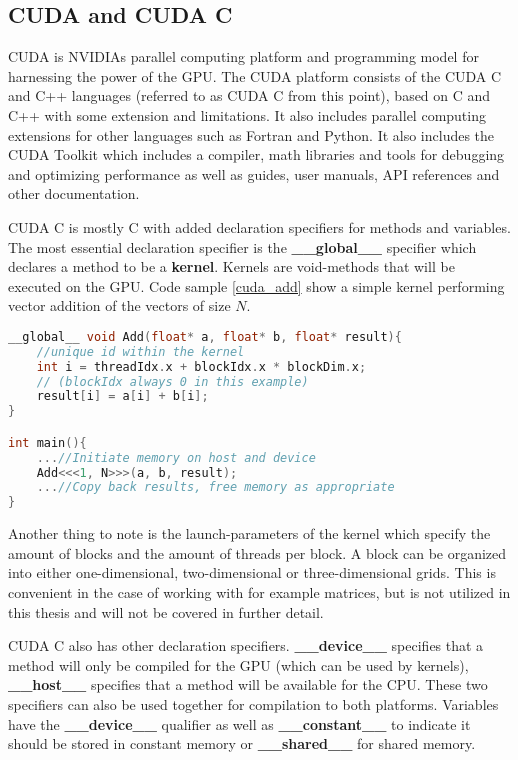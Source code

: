 \subsection{CUDA and CUDA C}
CUDA is NVIDIAs parallel computing platform and programming model for harnessing the power of the GPU.
The CUDA platform consists of the CUDA C and C++ languages (referred to as CUDA C from this point), based on C and C++ with some extension and limitations. It also includes parallel computing extensions for other languages such as Fortran and Python. It also includes the CUDA Toolkit which includes a compiler, math libraries and tools for debugging and optimizing performance as well as guides, user manuals, API references and other documentation.

CUDA C is mostly C with added declaration specifiers for methods and variables. The most essential declaration specifier is the \textbf{\_\_global\_\_} specifier which declares a method to be a \textbf{kernel}. Kernels are void-methods that will be executed on the GPU. Code sample \ref{cuda_add} show a simple kernel performing vector addition of the vectors of size $N$.

\begin{lstlisting}[language=C++, caption=CUDA C addition kernel, label=cuda_add]
__global__ void Add(float* a, float* b, float* result){
	//unique id within the kernel
	int i = threadIdx.x + blockIdx.x * blockDim.x;
	// (blockIdx always 0 in this example)
	result[i] = a[i] + b[i];
}

int main(){
	...//Initiate memory on host and device
	Add<<<1, N>>>(a, b, result);
	...//Copy back results, free memory as appropriate
}
\end{lstlisting}

Another thing to note is the launch-parameters of the kernel which specify the amount of blocks and the amount of threads per block. A block can be organized into either one-dimensional, two-dimensional or three-dimensional grids. This is convenient in the case of working with for example matrices, but is not utilized in this thesis and will not be covered in further detail.

CUDA C also has other declaration specifiers. \textbf{\_\_device\_\_} specifies that a method will only be compiled for the GPU (which can be used by kernels), \textbf{\_\_host\_\_} specifies that a method will be available for the CPU. These two specifiers can also be used together for compilation to both platforms.
Variables have the \textbf{\_\_device\_\_} qualifier as well as \textbf{\_\_constant\_\_} to indicate it should be stored in constant memory or \textbf{\_\_shared\_\_} for shared memory.

